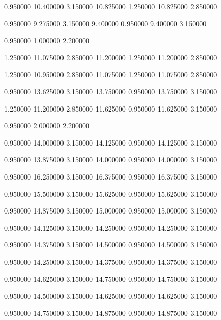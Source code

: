 {0.950000} {10.400000} {3.150000} {10.825000} {1.250000} {10.825000} {2.850000}

 {0.950000} {9.275000} {3.150000} {9.400000} {0.950000} {9.400000} {3.150000}

 {0.950000} {1.000000} {2.200000}

 {1.250000} {11.075000} {2.850000} {11.200000} {1.250000} {11.200000} {2.850000}

 {1.250000} {10.950000} {2.850000} {11.075000} {1.250000} {11.075000} {2.850000}

 {0.950000} {13.625000} {3.150000} {13.750000} {0.950000} {13.750000} {3.150000}

 {1.250000} {11.200000} {2.850000} {11.625000} {0.950000} {11.625000} {3.150000}

 {0.950000} {2.000000} {2.200000}

 {0.950000} {14.000000} {3.150000} {14.125000} {0.950000} {14.125000} {3.150000}

 {0.950000} {13.875000} {3.150000} {14.000000} {0.950000} {14.000000} {3.150000}

 {0.950000} {16.250000} {3.150000} {16.375000} {0.950000} {16.375000} {3.150000}

 {0.950000} {15.500000} {3.150000} {15.625000} {0.950000} {15.625000} {3.150000}

 {0.950000} {14.875000} {3.150000} {15.000000} {0.950000} {15.000000} {3.150000}

 {0.950000} {14.125000} {3.150000} {14.250000} {0.950000} {14.250000} {3.150000}

 {0.950000} {14.375000} {3.150000} {14.500000} {0.950000} {14.500000} {3.150000}

 {0.950000} {14.250000} {3.150000} {14.375000} {0.950000} {14.375000} {3.150000}

 {0.950000} {14.625000} {3.150000} {14.750000} {0.950000} {14.750000} {3.150000}

 {0.950000} {14.500000} {3.150000} {14.625000} {0.950000} {14.625000} {3.150000}

 {0.950000} {14.750000} {3.150000} {14.875000} {0.950000} {14.875000} {3.150000}

